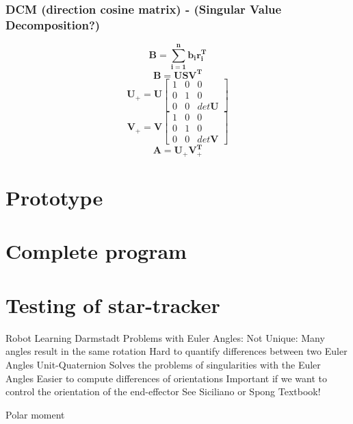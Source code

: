 \documentclass[12pt,a4paper,oneside]{article}
\begin{document}
\subsubsection{DCM (direction cosine matrix) - (Singular Value Decomposition?)}
\cite{6187242}
\begin{equation}
\bm{B = \sum_{i=1}^nb_ir_i^T}
\end{equation}
\begin{equation}
\bm{B = USV^T}
\end{equation}
\begin{equation}
\bm{U}_+ = \bm{U}\begin{bmatrix}
1 & 0 & 0 \\
0 & 1 & 0 \\
0 & 0 & det\bm{U}
\end{bmatrix}
\end{equation}
\begin{equation}
\bm{V}_+ = \bm{V}\begin{bmatrix}
1 & 0 & 0 \\
0 & 1 & 0 \\
0 & 0 & det\bm{V}
\end{bmatrix}
\end{equation}
\begin{equation}
\bm{A = U_+V_+^T}
\end{equation}
\newpage
\section{Prototype}

\newpage
\section{Complete program}

\newpage
\section{Testing of star-tracker}
\newpage






\newpage

\listoftables

\newpage

\listoffigures

\newpage


Robot Learning Darmstadt
Problems with Euler Angles:
Not Unique: Many angles result in the same rotation
Hard to quantify differences between two Euler Angles
Unit-Quaternion
Solves the problems of singularities with the Euler Angles
Easier to compute differences of orientations
Important if we want to control the orientation of the end-effector
See Siciliano or Spong Textbook!


Polar moment
\end{document}
